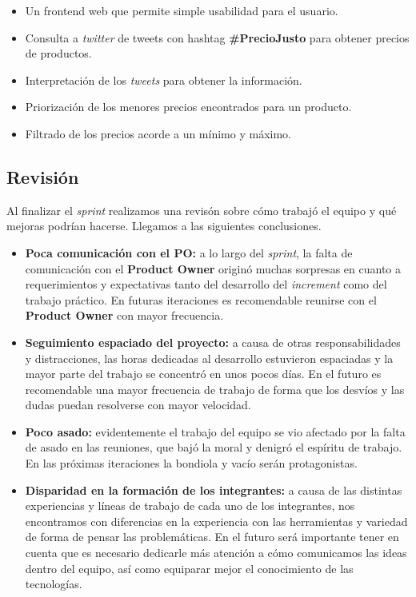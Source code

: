 \documentclass[10pt, a4paper]{article}
\begin{document}
\begin{itemize}
  \item Un frontend web que permite simple usabilidad para el usuario.
  \item Consulta a \emph{twitter} de tweets con hashtag \textbf{\#PrecioJusto} para obtener precios de productos.
  \item Interpretación de los \emph{tweets} para obtener la información.
  \item Priorización de los menores precios encontrados para un producto.
  \item Filtrado de los precios acorde a un mínimo y máximo.
\end{itemize}

\subsection{Revisión}

Al finalizar el \emph{sprint} realizamos una revisón sobre cómo trabajó el equipo y qué mejoras podrían hacerse. Llegamos a las siguientes conclusiones. 

\begin{itemize}
  \item \textbf{Poca comunicación con el PO:} a lo largo del \emph{sprint}, la falta de comunicación con el \textbf{Product Owner} originó muchas sorpresas en cuanto a requerimientos y expectativas tanto del desarrollo del \emph{increment} como del trabajo práctico. En futuras iteraciones es recomendable reunirse con el \textbf{Product Owner} con mayor frecuencia.
  \item \textbf{Seguimiento espaciado del proyecto:} a causa de otras responsabilidades y distracciones, las horas dedicadas al desarrollo estuvieron espaciadas y la mayor parte del trabajo se concentró en unos pocos días. En el futuro es recomendable una mayor frecuencia de trabajo de forma que los desvíos y las dudas puedan resolverse con mayor velocidad.
  \item \textbf{Poco asado:} evidentemente el trabajo del equipo se vio afectado por la falta de asado en las reuniones, que bajó la moral y denigró el espíritu de trabajo. En las próximas iteraciones la bondiola y vacío serán protagonistas.
  \item \textbf{Disparidad en la formación de los integrantes:} a causa de las distintas experiencias y líneas de trabajo de cada uno de los integrantes, nos encontramos con diferencias en la experiencia con las herramientas y variedad de forma de pensar las problemáticas. En el futuro será importante tener en cuenta que es necesario dedicarle más atención a cómo comunicamos las ideas dentro del equipo, así como equiparar mejor el conocimiento de las tecnologías.
\end{itemize}
\end{document}
